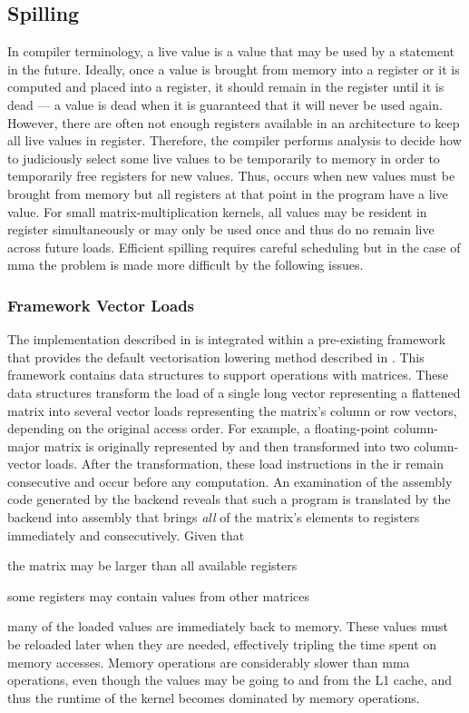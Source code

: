 \documentclass[\main/thesis.tex]{subfiles}
\begin{document}
\subsection{Spilling}
In compiler terminology, a \gls{live} value is a value that may be used by a statement in the future.
Ideally, once a value is brought from memory into a register or it is computed and placed into a register, it should remain in the register until it is \gls{dead} --- a value is dead when it is guaranteed that it will never be used again.
However, there are often not enough registers available in an architecture to keep all live values in register.
Therefore, the compiler performs analysis to decide how to judiciously select some live values to be temporarily  to memory in order to temporarily free registers for new values.
Thus,  occurs when new values must be brought from memory but all registers at that \gls{point} in the program have a \gls{live} value.
For small matrix-multiplication kernels, all values may be resident in register simultaneously or may only be used once and thus do no remain \gls{live} across future loads.
Efficient spilling requires careful scheduling but in the case of \gls{mma} the problem is made more difficult by the following issues.

\subsubsection{Framework Vector Loads}
The implementation described in  is integrated within a pre-existing framework that provides the default vectorisation lowering method described in .
This framework contains data structures to support operations with matrices.
These data structures transform the load of a single long vector representing a flattened matrix into several vector loads representing the matrix's column or row vectors, depending on the original access order.
For example, a floating-point column-major matrix  is originally represented by  and then transformed into two  column-vector loads.
After the transformation, these load instructions in the \gls{ir} remain consecutive and occur before any computation.
An examination of the assembly code generated by the backend reveals that such a program is translated by the backend into assembly that brings \emph{all} of the matrix's elements to registers immediately and consecutively.
Given that
\begin{enumerate*}[itemjoin={{; }}, itemjoin*={{; or }}, label=(\arabic*), after={,}]
  \item the matrix may be larger than all available registers
  \item some registers may contain values from other matrices
\end{enumerate*}
many of the loaded values are immediately  back to memory.
These values must be reloaded later when they are needed, effectively tripling the time spent on memory accesses.
Memory operations are considerably slower than \gls{mma} operations, even though the values may be going to and from the L1 cache, and thus the runtime of the kernel becomes dominated by memory operations.
\end{document}

